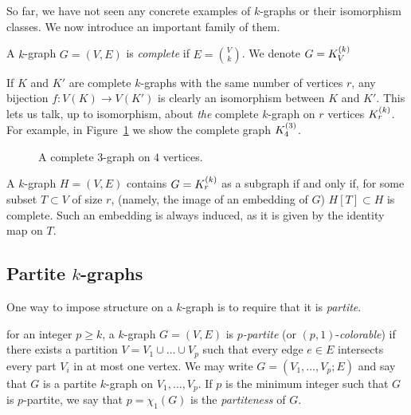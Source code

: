 So far, we have not seen any concrete examples of $k$-graphs or their isomorphism classes.
We now introduce an important family of them.

\begin{definition} \label{def:complete}
    A $k$-graph $G = (V, E)$ is \emph{complete} if $E = \binom{V}{k}$.
    We denote $G = K^{(k)}_{V}$
\end{definition}

If $K$ and $K'$ are complete $k$-graphs with the same number of vertices $r$,
any bijection $f: V(K) \to V(K')$ is clearly an isomorphism between $K$ and $K'$.
This lets us talk, up to isomorphism, about \emph{the} complete $k$-graph on $r$ vertices $K^{(k)}_{r}$.
For example, in Figure~\ref{fig:complete_kgraph} we show the complete graph $K^{(3)}_{4}$.

\begin{figure}[htbp]
    \centering
    
    \caption{A complete $3$-graph on $4$ vertices.}
    \label{fig:complete_kgraph}
\end{figure}

\begin{remark}
    A $k$-graph $H = (V, E)$ contains $G = K^{(k)}_{r}$ as a subgraph if and only if,
    for some subset $T \subset V$ of size $r$, (namely, the image of an embedding of $G$)
    $H[T] \subset H$ is complete.
    Such an embedding is always induced, as it is given by the identity map on $T$.
\end{remark}

\subsection{Partite $k$-graphs}\label{subsec:partite}

One way to impose structure on a $k$-graph is to require that it is \emph{partite}.

\begin{definition} \label{def:partite}
    for an integer $p \geq k$, a $k$-graph $G = (V, E)$ is \emph{$p$-partite}
    (or $(p, 1)$-\emph{colorable})
    if there exists a partition $V = V_1 \cup \dots \cup V_p$
    such that every edge $e \in E$ intersects every part $V_i$ in at most one vertex.
    We may write $G = (V_1, \dots, V_p; E)$ and say that
    $G$ is a partite $k$-graph on $V_1, \dots, V_p$.
    If $p$ is the minimum integer such that $G$ is $p$-partite,
    we say that $p = \chi_{1}(G)$ is the \emph{partiteness} of $G$.
\end{definition}

